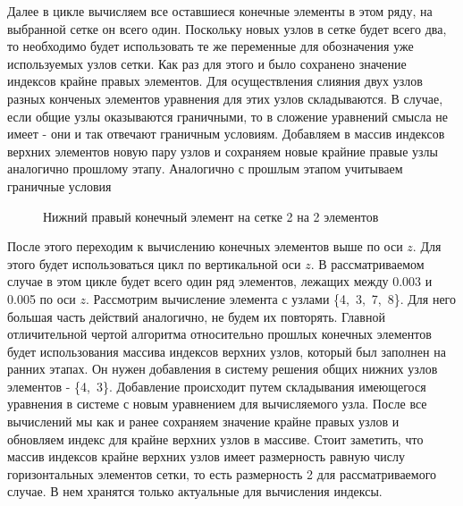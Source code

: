 \documentclass[a4paper,14pt]{extarticle}
\begin{document}
Далее в цикле вычисляем все оставшиеся конечные элементы в этом ряду, на выбранной сетке он всего один. Поскольку новых узлов в сетке будет всего два, то необходимо будет использовать те же переменные для обозначения уже используемых узлов сетки. Как раз для этого и было сохранено значение индексов крайне правых элементов. Для осуществления слияния двух узлов разных конченых элементов уравнения для этих узлов складываются. В случае, если общие узлы оказываются граничными, то в сложение уравнений смысла не имеет - они и так отвечают граничным условиям. Добавляем в массив индексов верхних элементов новую пару узлов и сохраняем новые крайние правые узлы аналогично прошлому этапу. Аналогично с прошлым этапом учитываем граничные условия
\begin{figure}[!htbp]
	\caption{Нижний правый конечный элемент на сетке 2 на 2 элементов}
	\label{right-bottom-el}
\end{figure}
\newpage
После этого переходим к вычислению конечных элементов выше по оси $z$.  Для этого будет использоваться цикл по вертикальной оси $z$. В рассматриваемом случае в этом цикле будет всего один ряд элементов, лежащих между 0.003 и 0.005 по оси $z$.
Рассмотрим вычисление элемента с узлами \{4,~3,~7,~8\}. Для него большая часть действий аналогично, не будем их повторять. Главной отличительной чертой алгоритма относительно прошлых конечных элементов будет использования массива индексов верхних узлов, который был заполнен на ранних этапах. Он нужен добавления в систему решения общих нижних узлов элементов - \{4,~3\}. Добавление происходит путем складывания имеющегося уравнения в системе с новым уравнением для вычисляемого узла. После все вычислений мы как и ранее сохраняем значение крайне правых узлов и обновляем индекс для крайне верхних узлов в массиве. Стоит заметить, что массив индексов крайне верхних узлов имеет размерность равную числу горизонтальных элементов сетки, то есть размерность 2 для рассматриваемого случае. В нем хранятся только актуальные для вычисления индексы.
\end{document}
